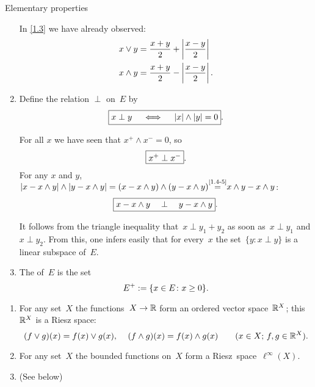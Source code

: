 \documentclass[main.tex]{subfiles}
\begin{document}
\begin{psec}{Elementary properties}
\begin{enumerate}
In \ref{1.3} 
we have already observed:
\begin{align*}
x \vee y 
  &= \frac{x+y}{2} + \left | \frac{x-y}{2} \right | \\
x \wedge y 
  &= \frac{x+y}{2} - \left | \frac{x-y}{2} \right | 
\textnormal{.}
\end{align*}
%
\item
\label{1.4-11}
Define the relation $\perp$ on~$E$ by
\begin{equation*}
\fbox{$ x \perp y \quad \iff \quad |x|\wedge|y|=0 $}
\textnormal{.}
\end{equation*}

For all $x$ we have seen that $x^+\wedge x^- = 0$,
so
\begin{equation*}
\fbox{$ x^+ \perp x^- $}
\textnormal{.}
\end{equation*}
For any $x$ and $y$, 
$|x-x\wedge y|\wedge|y-x\wedge y|
=(x-x\wedge y) \wedge (y-x\wedge y)
\isref{1.4-5} x\wedge y - x\wedge y$:
\begin{equation*}
\fbox{$ x-x\wedge y \quad \perp \quad y- x\wedge y $}
\textnormal{.}
\end{equation*}

It follows from the triangle inequality
 that~$x\perp y_1 + y_2$
as soon as~$x\perp y_1$ and $x\perp y_2$.
From this,
one infers easily that for every~$x$
the set~$\{ y: x\perp y\}$
is a linear subspace of~$E$.
%
\item \label{1.14-12}
The  of~$E$ is the set
\begin{equation*}
E^+ := \{x\in E\colon x\ge 0\}
\textnormal{.}
\end{equation*}
\end{enumerate}
\end{psec}
%
%
\begin{psec}[Examples]
\label{1.5}
\begin{enumerate}
\item
\label{1.5-1}
For any set~$X$
the functions~$X\rightarrow \mathbb{R}$
form an ordered vector space~$\mathbb{R}^X$;
this~$\mathbb{R}^X$ is a Riesz space:
\begin{equation*}
(f\vee g)(x) = f(x)\vee g(x)\textnormal{, } \quad 
(f\wedge g)(x) = f(x)\wedge g(x)\qquad
(x\in X\textnormal{; }f,g\in\mathbb{R}^X)
\textnormal{.}
\end{equation*}
%
\item
\label{1.5-2}
For any set~$X$ the bounded functions on~$X$ form a 
Riesz~space~$\ell^\infty(X)$.
%
\item
\label{1.5-3}
(See below)
\end{enumerate}
\end{psec}
\end{document}
